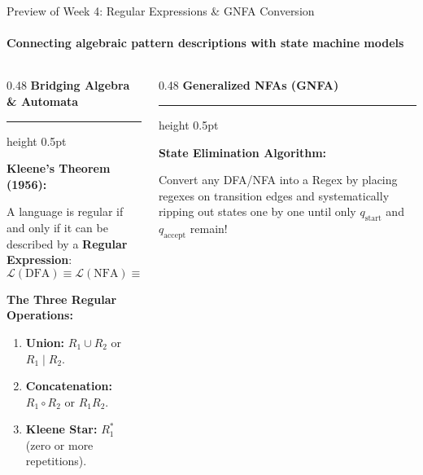 \documentclass[aspectratio=169, 10pt]{beamer}
\newcommand{\colheader}[1]{%
  {\noindent\footnotesize\bfseries\color{gimpanavy}#1}%
  \vspace{0.02cm}%
  {\color{gimpanavy!30}\hrule height 0.5pt}%
  \vspace{0.05cm}%
}
\newcommand{\cardtitle}[1]{{\noindent\footnotesize\bfseries\color{gimpanavy}#1}\par\vspace{0.03cm}}
\newcommand{\greentitle}[1]{{\noindent\footnotesize\bfseries\color{accentGreen}#1}\par\vspace{0.03cm}}
\begin{document}
\begin{frame}{Preview of Week 4: Regular Expressions \& GNFA Conversion}
  \framesubtitle{Connecting algebraic pattern descriptions with state machine models}
  
  \begin{columns}[T]
    \begin{column}{0.48\textwidth}
      \colheader{Bridging Algebra \& Automata}
      \begin{tcolorbox}[conceptcard]
        \cardtitle{Kleene's Theorem (1956):}
        {\scriptsize
        A language is regular if and only if it can be described by a \textbf{Regular Expression}:
        \[ \mathcal{L}(\text{DFA}) \equiv \mathcal{L}(\text{NFA}) \equiv \mathcal{L}(\text{Regex}) \]
        \vspace{0.03cm}
        
        \textbf{The Three Regular Operations:}
        \begin{enumerate}\setlength{\itemsep}{1.5pt}\scriptsize
          \item \textbf{Union:} $R_1 \cup R_2$ or $R_1 \mid R_2$.
          \item \textbf{Concatenation:} $R_1 \circ R_2$ or $R_1 R_2$.
          \item \textbf{Kleene Star:} $R_1^*$ (zero or more repetitions).
        \end{enumerate}
        }
      \end{tcolorbox}
    \end{column}
    
    \begin{column}{0.48\textwidth}
      \colheader{Generalized NFAs (GNFA)}
      \begin{center}
      \end{center}
      \begin{tcolorbox}[examplecard]
        \greentitle{State Elimination Algorithm:}
        {\scriptsize
        Convert any DFA/NFA into a Regex by placing regexes on transition edges and systematically ripping out states one by one until only $q_{\text{start}}$ and $q_{\text{accept}}$ remain!
        }
      \end{tcolorbox}
    \end{column}
  \end{columns}
\end{frame}
\end{document}

